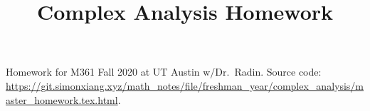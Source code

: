 \documentclass{scrartcl}
\title{Complex Analysis Homework}
\date{}
\begin{document}
\maketitle
Homework for M361 Fall 2020 at UT Austin w/Dr.\ Radin. Source code: \url{https://git.simonxiang.xyz/math_notes/file/freshman_year/complex_analysis/master_homework.tex.html}.
\tableofcontents
    
    
\end{document}
